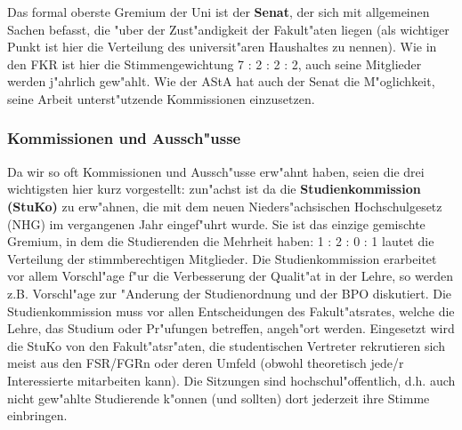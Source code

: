 Das formal oberste Gremium der Uni ist der \textbf{Senat}, der sich mit 
allgemeinen Sachen befasst, die "uber der Zust"andigkeit der Fakult"aten 
liegen (als wichtiger Punkt ist hier die Verteilung des universit"aren 
Haushaltes zu nennen). Wie in den FKR ist hier die Stimmengewichtung 7 : 2 : 2 
: 2, auch seine Mitglieder werden j"ahrlich gew"ahlt. Wie der AStA hat auch der 
Senat die M"oglichkeit, seine Arbeit unterst"utzende Kommissionen einzusetzen.

\subsubsection*{Kommissionen und Aussch"usse}

Da wir so oft Kommissionen und Aussch"usse erw"ahnt haben, seien die drei 
wichtigsten hier kurz vorgestellt: zun"achst ist da die 
\textbf{Studienkommission (StuKo)} zu erw"ahnen, die mit dem neuen 
Nieders"achsischen Hochschulgesetz (NHG) im vergangenen Jahr eingef"uhrt wurde. 
Sie ist das einzige gemischte Gremium, in dem die Studierenden die Mehrheit 
haben: 1 : 2 : 0 : 1 lautet die Verteilung der stimmberechtigen Mitglieder. Die 
Studienkommission erarbeitet vor allem Vorschl"age f"ur die Verbesserung der 
Qualit"at in der Lehre, so werden z.B. Vorschl"age zur "Anderung der 
Studienordnung und der BPO diskutiert. Die Studienkommission muss vor allen 
Entscheidungen des Fakult"atsrates, welche die Lehre, das Studium oder 
Pr"ufungen betreffen, angeh"ort werden. Eingesetzt wird die StuKo von den 
Fakult"atsr"aten, die studentischen Vertreter rekrutieren sich meist aus den 
FSR/FGRn oder deren Umfeld (obwohl theoretisch jede/r Interessierte mitarbeiten 
kann). Die Sitzungen sind hochschul"offentlich, d.h. auch nicht gew"ahlte 
Studierende k"onnen (und sollten) dort jederzeit ihre Stimme einbringen.


